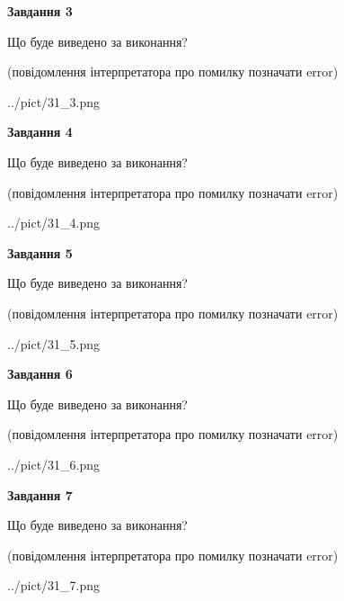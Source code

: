 \documentclass[12pt, ukrainian]{article}
\begin{document}
{\begin {large}
{\begin {center}\textbf{Завдання 3}\end {center}}\par
Що буде виведено за виконання?\par
 (повідомлення інтерпретатора про помилку позначати error)\par
\begin{center}
	{../pict/31_3.png}
\end{center}
\newpage

{\begin {center}\textbf{Завдання 4}\end {center}}\par
Що буде виведено за виконання?\par
 (повідомлення інтерпретатора про помилку позначати error)\par
\begin{center}
	{../pict/31_4.png}
\end{center}
\newpage

{\begin {center}\textbf{Завдання 5}\end {center}}\par
Що буде виведено за виконання?\par
 (повідомлення інтерпретатора про помилку позначати error)\par
\begin{center}
	{../pict/31_5.png}
\end{center}
\newpage

{\begin {center}\textbf{Завдання 6}\end {center}}\par
Що буде виведено за виконання?\par
 (повідомлення інтерпретатора про помилку позначати error)\par
\begin{center}
	{../pict/31_6.png}
\end{center}
\newpage

{\begin {center}\textbf{Завдання 7}\end {center}}\par
Що буде виведено за виконання?\par
 (повідомлення інтерпретатора про помилку позначати error)\par
\begin{center}
	{../pict/31_7.png}
\end{center}
\newpage


\end{large}}
\end{document}
